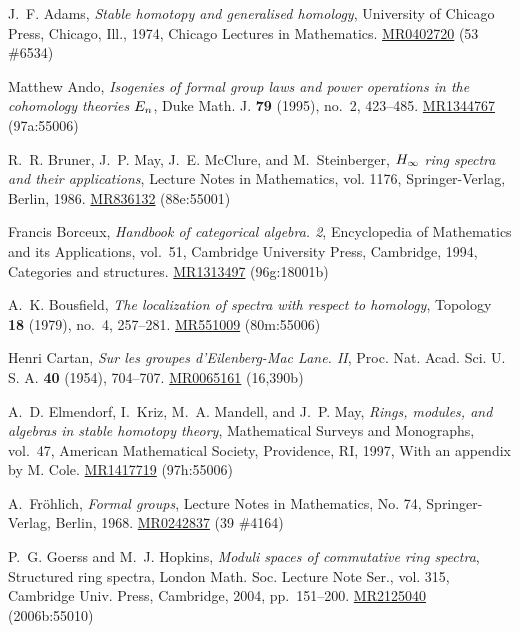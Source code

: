 \documentclass{gtpart}
\theoremstyle{definition}
\theoremstyle{remark}
\begin{document}
\newcommand{\MRn}[2]{\href{http://www.ams.org/mathscinet-getitem?mr=#1}{MR#1} #2}
\begin{thebibliography}

J.~F. Adams, \emph{Stable homotopy and generalised homology}, University of
  Chicago Press, Chicago, Ill., 1974, Chicago Lectures in Mathematics.
  \MRn{0402720}{(53 \#6534)}

Matthew Ando, \emph{Isogenies of formal group laws and power operations in the
  cohomology theories {$E\sb n$}}, Duke Math. J. \textbf{79} (1995), no.~2,
  423--485. \href{http://www.ams.org/mathscinet-getitem?mr=1344767}{MR1344767} (97a:55006)

R.~R. Bruner, J.~P. May, J.~E. McClure, and M.~Steinberger, \emph{{$H\sb \infty
  $} ring spectra and their applications}, Lecture Notes in Mathematics, vol.
  1176, Springer-Verlag, Berlin, 1986. \href{http://www.ams.org/mathscinet-getitem?mr=836132}{MR836132} (88e:55001)

Francis Borceux, \emph{Handbook of categorical algebra. 2}, Encyclopedia of
  Mathematics and its Applications, vol.~51, Cambridge University Press,
  Cambridge, 1994, Categories and structures. \MRn{1313497}{(96g:18001b)}

A.~K. Bousfield, \emph{The localization of spectra with respect to homology},
  Topology \textbf{18} (1979), no.~4, 257--281. \MRn{551009}{(80m:55006)}

Henri Cartan, \emph{Sur les groupes d'{E}ilenberg-{M}ac {L}ane. {II}}, Proc.
  Nat. Acad. Sci. U. S. A. \textbf{40} (1954), 704--707. \MRn{0065161}{(16,390b)}

A.~D. Elmendorf, I.~Kriz, M.~A. Mandell, and J.~P. May, \emph{Rings, modules,
  and algebras in stable homotopy theory}, Mathematical Surveys and Monographs,
  vol.~47, American Mathematical Society, Providence, RI, 1997, With an
  appendix by M. Cole. \MRn{1417719}{(97h:55006)}

A.~Fr{\"o}hlich, \emph{Formal groups}, Lecture Notes in Mathematics, No. 74,
  Springer-Verlag, Berlin, 1968. \MRn{0242837}{(39 \#4164)}

P.~G. Goerss and M.~J. Hopkins, \emph{Moduli spaces of commutative ring
  spectra}, Structured ring spectra, London Math. Soc. Lecture Note Ser., vol.
  315, Cambridge Univ. Press, Cambridge, 2004, pp.~151--200. \MRn{2125040}{(2006b:55010)}


\end{thebibliography}
\end{document}
